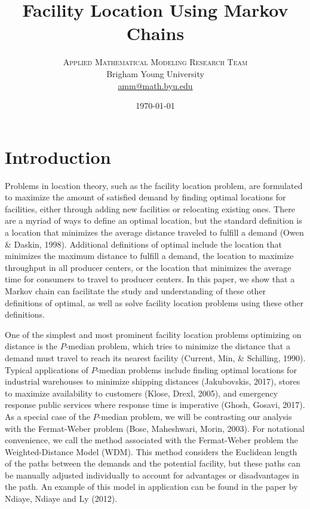 \documentclass[twoside,twocolumn]{article}
\title{Facility Location Using Markov Chains}
\author{
\textsc{Applied Mathematical Modeling Research Team}\\[1ex]
\normalsize Brigham Young University \\
\normalsize \href{mailto:amm@math.byu.edu}{amm@math.byu.edu}
}
\date{\today}
\begin{document}
\maketitle

\section{Introduction}

Problems in location theory, such as the facility location problem, are formulated to maximize the amount of satisfied demand by finding optimal locations for facilities, either through adding new facilities or relocating existing ones.
There are a myriad of ways to define an optimal location, but the standard definition is a location that minimizes the average distance traveled to fulfill a demand (Owen \& Daskin, 1998).
Additional definitions of optimal include the location that minimizes the maximum distance to fulfill a demand, the location to maximize throughput in all producer centers, or the location that minimizes the average time for consumers to travel to producer centers. %
In this paper, we show that a Markov chain can facilitate the study and understanding of these other definitions of optimal, as well as solve facility location problems using these other definitions.

One of the simplest and most prominent facility location problems optimizing on distance is the $P$-median problem, which tries to minimize the distance that a demand must travel to reach its nearest facility (Current, Min, \& Schilling, 1990). %
Typical applications of $P$-median problems include finding optimal locations for industrial warehouses to minimize shipping distances (Jakubovskis, 2017), stores to maximize availability to customers (Klose, Drexl, 2005), and emergency response public services where response time is imperative (Ghosh, Gosavi, 2017).
As a special case of the $P$-median problem, we will be contrasting our analysis with the Fermat-Weber problem (Bose, Maheshwari, Morin, 2003). 
For notational convenience, we call the method associated with the Fermat-Weber problem the Weighted-Distance Model (WDM). %
This method considers the Euclidean length of the paths between the demands and the potential facility, but these paths can be manually adjusted individually to account for advantages or disadvantages in the path. %
An example of this model in application can be found in the paper by Ndiaye, Ndiaye and Ly (2012). %
\end{document}
